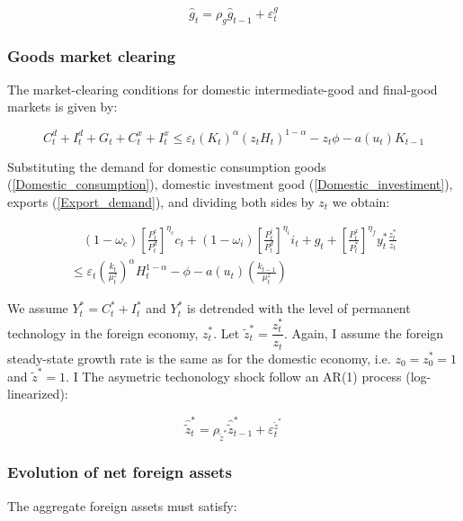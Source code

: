 \documentclass[12pt,oneside,a4paper]{article}
\begin{document}
\begin{equation}
    \hat{g}_t = \rho_g \hat{g}_{t-1} + \varepsilon_{t}^{g}
\end{equation}
\subsubsection{Goods market clearing}
The market-clearing conditions for domestic intermediate-good and final-good markets is given by:

\begin{equation}
\label{Market_clearing}
    C_{t}^{d}+I_{t}^{d}+G_{t}+C_{t}^{x}+I_{t}^{x} \leq \varepsilon_{t}\left(K_{t}\right)^{\alpha}\left(z_{t} H_{t}\right)^{1-\alpha}-z_{t} \phi-a\left(u_{t}\right) K_{t-1}
\end{equation}

Substituting the demand for domestic consumption goods (\ref{Domestic_consumption}), domestic investment good (\ref{Domestic_investiment}), exports (\ref{Export_demand}), and dividing both sides by $z_t$ we obtain:

\begin{equation}
    \begin{array}{l}
\quad\left(1-\omega_{c}\right)\left[\frac{P_{t}^{c}}{P_{t}^{d}}\right]^{\eta_{c}} c_{t}+\left(1-\omega_{i}\right)\left[\frac{P_{t}^{i}}{P_{t}^{d}}\right]^{\eta_{i}} i_{t}+g_{t}+\left[\frac{P_{t}^{x}}{P_{t}^{*}}\right]^{\eta_{f}} y_{t}^{*} \frac{z_{t}^{*}}{z_{t}} \\
\leq \varepsilon_{t}\left(\frac{k_{t}}{\mu_{t}^{z}}\right)^{\alpha} H_{t}^{1-\alpha}-\phi-a\left(u_{t}\right)\left(\frac{k_{t-1}}{\mu_{t}^{z}}\right)
\end{array}
\end{equation}

We assume $Y_t^{*} = C_t^{*} + I_t^{*}$ and $Y_t^{*}$ is detrended with the level of permanent technology in the foreign economy, $z_t^{*}$. Let $\tilde{z}_t^{*} = \dfrac{z_t^{*}}{z_t}$. Again, I assume the foreign steady-state growth rate is the same as for the domestic economy, i.e. $z_{0}=z_{0}^{*}=1$ and $\tilde{z}^{*}=1$. I The asymetric techonology shock follow an AR(1) process (log-linearized):

\begin{equation}
    \hat{\tilde{z}}_{t}^{*} = \rho_{\tilde{z}^{*}}\hat{\tilde{z}}_{t-1}^{*} + \varepsilon_t^{\tilde{z}^{*}}
\end{equation}
\subsubsection{Evolution of net foreign assets}
The aggregate foreign assets must satisfy:
\end{document}
